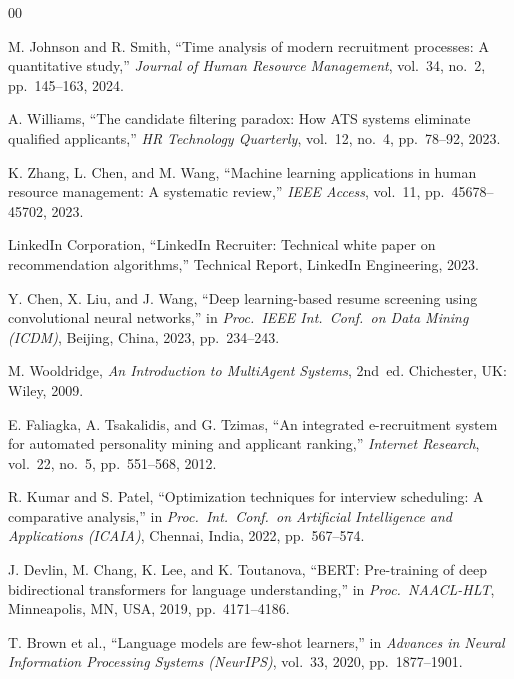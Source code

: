 \documentclass[conference]{IEEEtran}
\begin{document}
\begin{thebibliography}{00}

 M. Johnson and R. Smith, ``Time analysis of modern recruitment processes: A quantitative study,'' \textit{Journal of Human Resource Management}, vol.~34, no.~2, pp.~145--163, 2024.

 A. Williams, ``The candidate filtering paradox: How ATS systems eliminate qualified applicants,'' \textit{HR Technology Quarterly}, vol.~12, no.~4, pp.~78--92, 2023.

 K. Zhang, L. Chen, and M. Wang, ``Machine learning applications in human resource management: A systematic review,'' \textit{IEEE Access}, vol.~11, pp.~45678--45702, 2023.

 LinkedIn Corporation, ``LinkedIn Recruiter: Technical white paper on recommendation algorithms,'' Technical Report, LinkedIn Engineering, 2023.

 Y. Chen, X. Liu, and J. Wang, ``Deep learning-based resume screening using convolutional neural networks,'' in \textit{Proc.\ IEEE Int.\ Conf.\ on Data Mining (ICDM)}, Beijing, China, 2023, pp.~234--243.

 M. Wooldridge, \textit{An Introduction to MultiAgent Systems}, 2nd~ed. Chichester, UK: Wiley, 2009.

 E. Faliagka, A. Tsakalidis, and G. Tzimas, ``An integrated e-recruitment system for automated personality mining and applicant ranking,'' \textit{Internet Research}, vol.~22, no.~5, pp.~551--568, 2012.

 R. Kumar and S. Patel, ``Optimization techniques for interview scheduling: A comparative analysis,'' in \textit{Proc.\ Int.\ Conf.\ on Artificial Intelligence and Applications (ICAIA)}, Chennai, India, 2022, pp.~567--574.

 J. Devlin, M. Chang, K. Lee, and K. Toutanova, ``BERT: Pre-training of deep bidirectional transformers for language understanding,'' in \textit{Proc.\ NAACL-HLT}, Minneapolis, MN, USA, 2019, pp.~4171--4186.

 T. Brown et al., ``Language models are few-shot learners,'' in \textit{Advances in Neural Information Processing Systems (NeurIPS)}, vol.~33, 2020, pp.~1877--1901.

\end{thebibliography}
\end{document}
